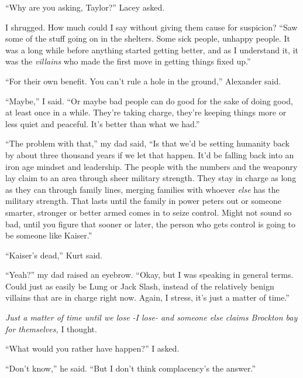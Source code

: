 ``Why are you asking, Taylor?''  Lacey asked.



I shrugged.  How much could I say without giving them cause for suspicion?  ``Saw some of the stuff going on in the shelters.  Some sick people, unhappy people.  It was a long while before anything started getting better, and as I understand it, it was the \emph{villains} who made the first move in getting things fixed up.''



``For their own benefit.  You can't rule a hole in the ground,'' Alexander said.



``Maybe,'' I said.  ``Or maybe bad people can do good for the sake of doing good, at least once in a while.  They're taking charge, they're keeping things more or less quiet and peaceful.  It's better than what we had.''



``The problem with that,'' my dad said, ``Is that we'd be setting humanity back by about three thousand years if we let that happen.  It'd be falling back into an iron age mindset and leadership.  The people with the numbers and the weaponry lay claim to an area through sheer military strength.  They stay in charge as long as they can through family lines, merging families with whoever \emph{else} has the military strength.  That lasts until the family in power peters out or someone smarter, stronger or better armed comes in to seize control.  Might not sound so bad, until you figure that sooner or later, the person who gets control is going to be someone like Kaiser.''



``Kaiser's dead,'' Kurt said.



``Yeah?'' my dad raised an eyebrow.  ``Okay, but I was speaking in general terms.  Could just as easily be Lung or Jack Slash, instead of the relatively benign villains that are in charge right now.  Again, I stress, it's just a matter of time.''



\emph{Just a matter of time until we lose -I lose- and someone else claims Brockton bay for themselves, }I thought.



``What would you rather have happen?'' I asked.



``Don't know,'' he said.  ``But I don't think complacency's the answer.''



